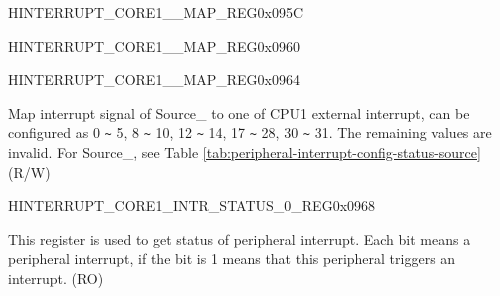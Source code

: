 \begin{register}{H}{INTERRUPT\_CORE1\_\_MAP\_REG}{0x095C}\label{regdesc:INTERRUPTCORE1CORE1PIFPMSMONITORVIOLATESIZEINTRMAPREG}
\end{register}
\vspace{-3em}

\begin{register}{H}{INTERRUPT\_CORE1\_\_MAP\_REG}{0x0960}\label{regdesc:INTERRUPTCORE1CACHECORE0ACSINTMAPREG}
\end{register}
\vspace{-3em}

\begin{register}{H}{INTERRUPT\_CORE1\_\_MAP\_REG}{0x0964}\label{regdesc:INTERRUPTCORE1CACHECORE1ACSINTMAPREG}
%
%
\regnewline%
\begin{regdesc}\begin{reglist}
\label{fielddesc:INTERRUPTCORE1CACHECORE1ACSINTMAP}\item [INTERRUPT\_CORE1\_SOURCE\_\regindex{Y}\_MAP] Map interrupt signal of Source\_ to one of CPU1 external interrupt, can be configured as 0 \verb+~+ 5, 8 \verb+~+ 10, 12 \verb+~+ 14, 17 \verb+~+ 28, 30 \verb+~+ 31. The remaining values are invalid. For Source\_, see Table \ref{tab:peripheral-interrupt-config-status-source} (R/W)
\end{reglist}\end{regdesc}
\end{register}



\begin{register}{H}{INTERRUPT\_CORE1\_INTR\_STATUS\_0\_REG}{0x0968}\label{regdesc:INTERRUPTCORE1INTRSTATUS0REG}
%
\regnewline%
\begin{regdesc}\begin{reglist}
\label{fielddesc:INTERRUPTCORE1INTRSTATUS0}\item [INTERRUPT\_CORE1\_INTR\_STATUS\_0] This register is used to get status of peripheral interrupt. Each bit means a peripheral interrupt, if the bit is 1 means that this peripheral triggers an interrupt. (RO)
\end{reglist}\end{regdesc}
\end{register}


